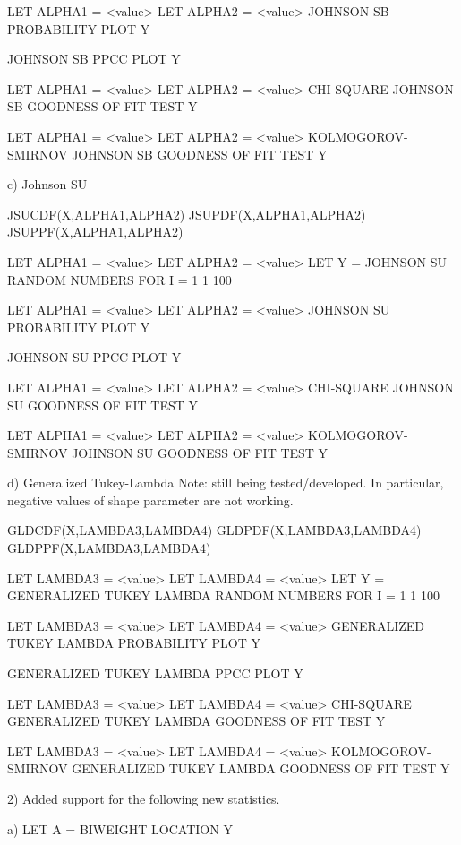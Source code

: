 {       LET ALPHA1 = <value>
       LET ALPHA2 = <value>
       JOHNSON SB PROBABILITY PLOT Y

       JOHNSON SB PPCC PLOT Y

       LET ALPHA1 = <value>
       LET ALPHA2 = <value>
       CHI-SQUARE JOHNSON SB GOODNESS OF FIT TEST Y

       LET ALPHA1 = <value>
       LET ALPHA2 = <value>
       KOLMOGOROV-SMIRNOV JOHNSON SB GOODNESS OF FIT TEST Y

    c) Johnson SU

       JSUCDF(X,ALPHA1,ALPHA2)
       JSUPDF(X,ALPHA1,ALPHA2)
       JSUPPF(X,ALPHA1,ALPHA2)

       LET ALPHA1 = <value>
       LET ALPHA2 = <value>
       LET Y = JOHNSON SU RANDOM NUMBERS FOR I = 1 1 100

       LET ALPHA1 = <value>
       LET ALPHA2 = <value>
       JOHNSON SU PROBABILITY PLOT Y

       JOHNSON SU PPCC PLOT Y

       LET ALPHA1 = <value>
       LET ALPHA2 = <value>
       CHI-SQUARE JOHNSON SU GOODNESS OF FIT TEST Y

       LET ALPHA1 = <value>
       LET ALPHA2 = <value>
       KOLMOGOROV-SMIRNOV JOHNSON SU GOODNESS OF FIT TEST Y

    d) Generalized Tukey-Lambda
       Note: still being tested/developed.  In particular,
       negative values of shape parameter are not working.

       GLDCDF(X,LAMBDA3,LAMBDA4)
       GLDPDF(X,LAMBDA3,LAMBDA4)
       GLDPPF(X,LAMBDA3,LAMBDA4)

       LET LAMBDA3 = <value>
       LET LAMBDA4 = <value>
       LET Y = GENERALIZED TUKEY LAMBDA RANDOM NUMBERS FOR I = 1 1 100

       LET LAMBDA3 = <value>
       LET LAMBDA4 = <value>
       GENERALIZED TUKEY LAMBDA PROBABILITY PLOT Y

       GENERALIZED TUKEY LAMBDA PPCC PLOT Y

       LET LAMBDA3 = <value>
       LET LAMBDA4 = <value>
       CHI-SQUARE GENERALIZED TUKEY LAMBDA GOODNESS OF FIT TEST Y

       LET LAMBDA3 = <value>
       LET LAMBDA4 = <value>
       KOLMOGOROV-SMIRNOV GENERALIZED TUKEY LAMBDA GOODNESS OF FIT TEST Y

 2) Added support for the following new statistics.

    a)  LET A = BIWEIGHT LOCATION Y

}
